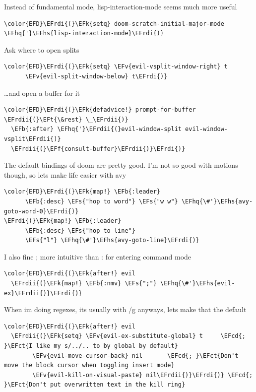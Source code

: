 \documentclass{scrartcl}
\newcommand{\EFk}[1]{\textcolor{EFk}{#1}} %
\newcommand{\EFt}[1]{\textcolor{EFt}{#1}} %
\newcommand{\EFs}[1]{\textcolor{EFs}{#1}} %
\newcommand{\EFb}[1]{\textcolor{EFb}{#1}} %
\newcommand{\EFct}[1]{\textcolor{EFct}{#1}} %
\newcommand{\EFv}[1]{\textcolor{EFv}{#1}} %
\newcommand{\EFf}[1]{\textcolor{EFf}{#1}} %
\newcommand{\EFcd}[1]{\textcolor{EFcd}{#1}} %
\newcommand{\EFhq}[1]{#1} %
\newcommand{\EFhs}[1]{#1} %
\newcommand{\EFrdi}[1]{#1} %
\newcommand{\EFrdii}[1]{#1} %
\begin{document}
Instead of fundamental mode, lisp-interaction-mode seems much more useful
\begin{Code}
\begin{Verbatim}[]
\color{EFD}\EFrdi{(}\EFk{setq} doom-scratch-initial-major-mode \EFhq{'}\EFhs{lisp-interaction-mode}\EFrdi{)}
\end{Verbatim}
\end{Code}

Ask where to open splits
\begin{Code}
\begin{Verbatim}[]
\color{EFD}\EFrdi{(}\EFk{setq} \EFv{evil-vsplit-window-right} t
      \EFv{evil-split-window-below} t\EFrdi{)}
\end{Verbatim}
\end{Code}

\ldots{}and open a buffer for it
\begin{Code}
\begin{Verbatim}[]
\color{EFD}\EFrdi{(}\EFk{defadvice!} prompt-for-buffer \EFrdii{(}\EFt{\&rest} \_\EFrdii{)}
  \EFb{:after} \EFhq{'}\EFrdii{(}evil-window-split evil-window-vsplit\EFrdii{)}
  \EFrdii{(}\EFf{consult-buffer}\EFrdii{)}\EFrdi{)}
\end{Verbatim}
\end{Code}

The default bindings of doom are pretty good. I'm not so good with motions though, so lets make life easier with avy
\begin{Code}
\begin{Verbatim}[]
\color{EFD}\EFrdi{(}\EFk{map!} \EFb{:leader}
      \EFb{:desc} \EFs{"hop to word"} \EFs{"w w"} \EFhq{\#'}\EFhs{avy-goto-word-0}\EFrdi{)}
\EFrdi{(}\EFk{map!} \EFb{:leader}
      \EFb{:desc} \EFs{"hop to line"}
      \EFs{"l"} \EFhq{\#'}\EFhs{avy-goto-line}\EFrdi{)}
\end{Verbatim}
\end{Code}

I also fine ; more intuitive than : for entering command mode
\begin{Code}
\begin{Verbatim}[]
\color{EFD}\EFrdi{(}\EFk{after!} evil
  \EFrdii{(}\EFk{map!} \EFb{:nmv} \EFs{";"} \EFhq{\#'}\EFhs{evil-ex}\EFrdii{)}\EFrdi{)}
\end{Verbatim}
\end{Code}

When im doing regexes, its usually with /g anyways, lets make that the default
\begin{Code}
\begin{Verbatim}[]
\color{EFD}\EFrdi{(}\EFk{after!} evil
  \EFrdii{(}\EFk{setq} \EFv{evil-ex-substitute-global} t     \EFcd{; }\EFct{I like my s/../.. to by global by default}
        \EFv{evil-move-cursor-back} nil       \EFcd{; }\EFct{Don't move the block cursor when toggling insert mode}
        \EFv{evil-kill-on-visual-paste} nil\EFrdii{)}\EFrdi{)} \EFcd{; }\EFct{Don't put overwritten text in the kill ring}
\end{Verbatim}
\end{Code}
\end{document}
